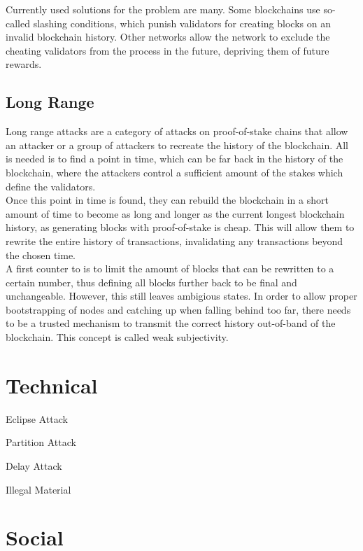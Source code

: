 \documentclass[11pt,a4paper,draft]{article}
\begin{document}
Currently used solutions for the problem are many. Some blockchains use so-called slashing conditions, which punish validators for creating blocks on an invalid blockchain history. Other networks allow the network to exclude the cheating validators from the process in the future, depriving them of future rewards.\\

\subsection{Long Range}

Long range attacks are a category of attacks on proof-of-stake chains that allow an attacker or a group of attackers to recreate the history of the blockchain. All is needed is to find a point in time, which can be far back in the history of the blockchain, where the attackers control a sufficient amount of the stakes which define the validators.\\

Once this point in time is found, they can rebuild the blockchain in a short amount of time to become as long and longer as the current longest blockchain history, as generating blocks with proof-of-stake is cheap. This will allow them to rewrite the entire history of transactions, invalidating any transactions beyond the chosen time.\\

A first counter to is to limit the amount of blocks that can be rewritten to a certain number, thus defining all blocks further back to be final and unchangeable. However, this still leaves ambigious states. In order to allow proper bootstrapping of nodes and catching up when falling behind too far, there needs to be a trusted mechanism to transmit the correct history out-of-band of the blockchain. This concept is called weak subjectivity.\\

\section{Technical}

Eclipse Attack

Partition Attack

Delay Attack

Illegal Material

\section{Social}
\end{document}
